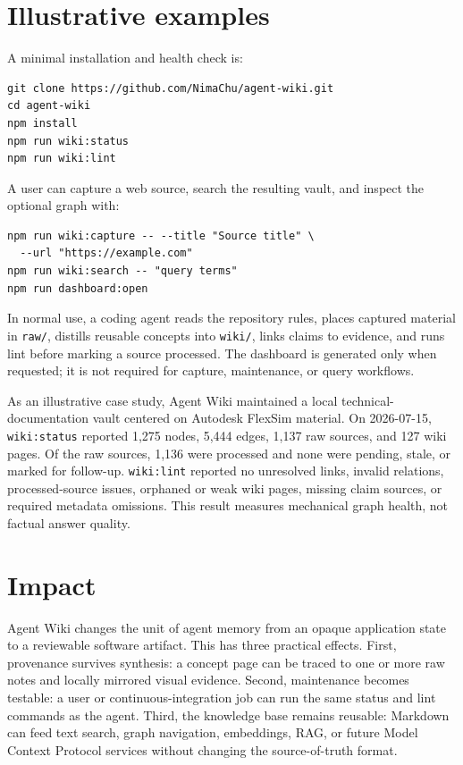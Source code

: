 \documentclass[preprint,12pt,a4paper]{elsarticle}
\begin{document}
\section{Illustrative examples}

A minimal installation and health check is:

\begin{verbatim}
git clone https://github.com/NimaChu/agent-wiki.git
cd agent-wiki
npm install
npm run wiki:status
npm run wiki:lint
\end{verbatim}

A user can capture a web source, search the resulting vault, and inspect the
optional graph with:

\begin{verbatim}
npm run wiki:capture -- --title "Source title" \
  --url "https://example.com"
npm run wiki:search -- "query terms"
npm run dashboard:open
\end{verbatim}

In normal use, a coding agent reads the repository rules, places captured
material in \texttt{raw/}, distills reusable concepts into \texttt{wiki/},
links claims to evidence, and runs lint before marking a source processed. The
dashboard is generated only when requested; it is not required for capture,
maintenance, or query workflows.

As an illustrative case study, Agent Wiki maintained a local technical-
documentation vault centered on Autodesk FlexSim material. On 2026-07-15,
\texttt{wiki:status} reported 1,275 nodes, 5,444 edges, 1,137 raw sources, and
127 wiki pages. Of the raw sources, 1,136 were processed and none were pending,
stale, or marked for follow-up. \texttt{wiki:lint} reported no unresolved links,
invalid relations, processed-source issues, orphaned or weak wiki pages,
missing claim sources, or required metadata omissions. This result measures
mechanical graph health, not factual answer quality.

\section{Impact}

Agent Wiki changes the unit of agent memory from an opaque application state to
a reviewable software artifact. This has three practical effects. First,
provenance survives synthesis: a concept page can be traced to one or more raw
notes and locally mirrored visual evidence. Second, maintenance becomes
testable: a user or continuous-integration job can run the same status and lint
commands as the agent. Third, the knowledge base remains reusable: Markdown can
feed text search, graph navigation, embeddings, RAG, or future Model Context
Protocol services without changing the source-of-truth format.
\end{document}
